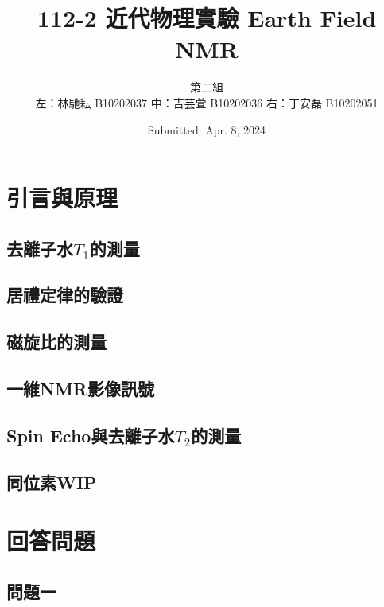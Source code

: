 \documentclass[twocolumn]{article}
\title{112-2 近代物理實驗 Earth Field NMR\\\vspace{1cm}}
\author{第二組 \\ 左：林馳耘 B10202037 中：吉芸萱 B10202036 右：丁安磊 B10202051}
\date{Submitted: Apr. 8, 2024}
\begin{document}
\newcommand{\momega}{~{\rm m}\Omega}
\renewcommand{\figurename}{圖}
\renewcommand{\tablename}{表}
\newcommand{\br}[1]{\left(#1\right)}
\renewcommand{\vb}[1]{\boldsymbol{\mathbf{#1}}} %
\newcommand\inlineeqno{\refstepcounter{equation}~~ \hspace*{\fill} \mbox{(\theequation)}}

\maketitle

\section{引言與原理}

\subsection{去離子水$T_1$的測量}


\subsection{居禮定律的驗證}
\subsection{磁旋比的測量}
\subsection{一維NMR影像訊號}
\subsection{Spin Echo與去離子水$T_2$的測量}
\subsection{同位素WIP}

\section{回答問題}

\newcommand\question[1]{
  \fbox{\parbox{\dimexpr\linewidth - 2\fboxrule - 2\fboxsep}{#1}}\vspace{2mm}
}

\subsection{問題一}\label{Q1}
\end{document}
